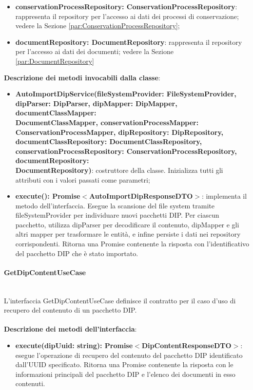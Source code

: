 \documentclass[a4paper,12pt]{article}
\begin{document}
{{\begin{itemize}
                    \item \textbf{conservationProcessRepository: ConservationProcessRepository}: rappresenta il repository per l'accesso ai dati dei processi di conservazione; vedere la Sezione \ref{par:ConservationProcessRepository};
                    \item \textbf{documentRepository: DocumentRepository}: rappresenta il repository per l'accesso ai dati dei documenti; vedere la Sezione \ref{par:DocumentRepository} 
                \end{itemize}
                
              \noindent \textbf{Descrizione dei metodi invocabili dalla classe}:
                \begin{itemize}
                    \item \textbf{AutoImportDipService(fileSystemProvider: FileSystemProvider, dipParser: DipParser, dipMapper: DipMapper, documentClassMapper:\\ DocumentClassMapper, conservationProcessMapper:\\ ConservationProcessMapper, dipRepository: DipRepository,\\ documentClassRepository: DocumentClassRepository, conservationProcessRepository: ConservationProcessRepository, documentRepository:\\ DocumentRepository)}: costruttore della classe. Inizializza tutti gli attributi con i valori passati come parametri;
                    \item \textbf{execute(): Promise$<$AutoImportDipResponseDTO$>$}: implementa il metodo dell'interfaccia. Esegue la scansione del file system tramite fileSystemProvider per individuare nuovi pacchetti DIP. Per ciascun pacchetto, utilizza dipParser per decodificare il contenuto, dipMapper e gli altri mapper per trasformare le entità, e infine persiste i dati nei repository corrispondenti. Ritorna una Promise contenente la risposta con l’identificativo del pacchetto DIP che è stato importato.
                \end{itemize}
                \paragraph{GetDipContentUseCase}\label{par:GetDipContentUseCase}\mbox{}\\
                L'interfaccia GetDipContentUseCase definisce il contratto per il caso d'uso di recupero del contenuto di un pacchetto DIP.\\
                \\
              \noindent \textbf{Descrizione dei metodi dell'interfaccia}:
                \begin{itemize}
                    \item \textbf{execute(dipUuid: string): Promise$<$DipContentResponseDTO$>$}: esegue l'operazione di recupero del contenuto del pacchetto DIP identificato dall'UUID specificato. Ritorna una Promise contenente la risposta con le informazioni principali del pacchetto DIP e l’elenco dei documenti in esso contenuti.
                \end{itemize}
}}
\end{document}
